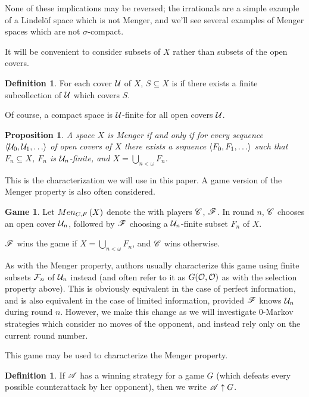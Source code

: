 \documentclass{amsart}
\newtheorem{proposition}[theorem]{Proposition}
\theoremstyle{definition}
\newtheorem{definition}[theorem]{Definition}
\newtheorem{game}[theorem]{Game}
\begin{document}
None of these implications may be reversed; the irrationals are a simple example
of a Lindel\"of space which is not Menger, and we'll see several examples of
Menger spaces which are not \(\sigma\)-compact.

It will be convenient to consider subsets of \(X\) rather than subsets of
the open covers.

\begin{definition}
  For each cover \(\mathcal{U}\) of \(X\), \(S\subseteq X\) is
   if
  there exists a finite subcollection of \(\mathcal{U}\) which covers \(S\).
\end{definition}

Of course, a compact space is \(\mathcal{U}\)-finite for all open covers \(\mathcal{U}\).

\begin{proposition}
  A space \(X\) is Menger if and only if
  for every sequence \(\<\mc U_0,\mc U_1,\dots\>\)
  of open covers of \(X\) there exists a sequence
  \(\<F_0,F_1,\dots\>\) such that \(F_n\subseteq X\), \(F_n\) is
  \(\mathcal{U}_n\)-finite, and \(X=\bigcup_{n<\omega}F_n\).
\end{proposition}

This is the characterization we will use in this paper.
A game version of the Menger property is also often considered.

\begin{game}
  Let \(Men_{C,F}\left({X}\right)\) denote the  with players \(\mathscr{C}\), \(\mathscr{F}\).
  In round \(n\), \(\mathscr{C}\) chooses an open cover \(\mathcal{U}_n\), followed by \(\mathscr{F}\)
  choosing a \(\mathcal{U}_n\)-finite subset \(F_n\) of \(X\).

  \(\mathscr{F}\) wins the game if \(X = \bigcup_{n<\omega}F_n\),
  and \(\mathscr{C}\) wins otherwise.
\end{game}

As with the Menger property, authors usually characterize this game using
finite subsets \(\mathcal{F}_n\)
of \(\mathcal{U}_n\) instead (and often refer to it as \(G(\mathcal{O},\mathcal{O})\) as
with the selection property above).
This is obviously equivalent in the case of perfect
information, and is also equivalent
in the case of limited information, provided \(\mathscr{F}\)
knows \(\mathcal{U}_n\) during round \(n\). However, we make this change as we
will investigate \(0\)-Markov strategies which consider no moves of
the opponent, and instead rely only on the current round number.

This game may be used to characterize the Menger property.

\begin{definition}
  If \(\mathscr{A}\) has a winning strategy for a game \(G\) (which defeats every
  possible counterattack by her opponent), then we write \(\mathscr{A}\uparrow G\).
\end{definition}
\end{document}

